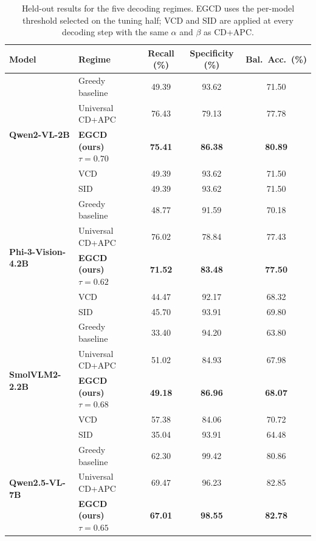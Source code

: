 \documentclass[pdflatex,sn-basic,Numbered]{sn-jnl}
\theoremstyle{thmstyleone}
\theoremstyle{thmstyletwo}
\theoremstyle{thmstylethree}
\begin{document}
\begin{table}[h]
\caption{Held-out results for the five decoding regimes. EGCD uses the per-model threshold selected on the tuning half; VCD and SID are applied at every decoding step with the same $\alpha$ and $\beta$ as CD+APC.}\label{tab:main}
\begin{tabular}{@{}llccc@{}}
\toprule
\textbf{Model} & \textbf{Regime} & \textbf{Recall (\%)} & \textbf{Specificity (\%)} & \textbf{Bal.\ Acc.\ (\%)} \\
\midrule
\multirow{5}{*}{\textbf{Qwen2-VL-2B}}
 & Greedy baseline            & 49.39 & 93.62 & 71.50 \\
 & Universal CD+APC           & 76.43 & 79.13 & 77.78 \\
 & \textbf{EGCD (ours) $\tau = 0.70$} & \textbf{75.41} & \textbf{86.38} & \textbf{80.89} \\
 & VCD                        & 49.39 & 93.62 & 71.50 \\
 & SID                        & 49.39 & 93.62 & 71.50 \\
\midrule
\multirow{5}{*}{\textbf{Phi-3-Vision-4.2B}}
 & Greedy baseline            & 48.77 & 91.59 & 70.18 \\
 & Universal CD+APC           & 76.02 & 78.84 & 77.43 \\
 & \textbf{EGCD (ours) $\tau = 0.62$} & \textbf{71.52} & \textbf{83.48} & \textbf{77.50} \\
 & VCD                        & 44.47 & 92.17 & 68.32 \\
 & SID                        & 45.70 & 93.91 & 69.80 \\
\midrule
\multirow{5}{*}{\textbf{SmolVLM2-2.2B}}
 & Greedy baseline            & 33.40 & 94.20 & 63.80 \\
 & Universal CD+APC           & 51.02 & 84.93 & 67.98 \\
 & \textbf{EGCD (ours) $\tau = 0.68$} & \textbf{49.18} & \textbf{86.96} & \textbf{68.07} \\
 & VCD                        & 57.38 & 84.06 & 70.72 \\
 & SID                        & 35.04 & 93.91 & 64.48 \\
\midrule
\multirow{5}{*}{\textbf{Qwen2.5-VL-7B}}
 & Greedy baseline            & 62.30 & 99.42 & 80.86 \\
 & Universal CD+APC           & 69.47 & 96.23 & 82.85 \\
 & \textbf{EGCD (ours) $\tau = 0.65$} & \textbf{67.01} & \textbf{98.55} & \textbf{82.78} \\

\end{tabular}
\end{table}
\end{document}
